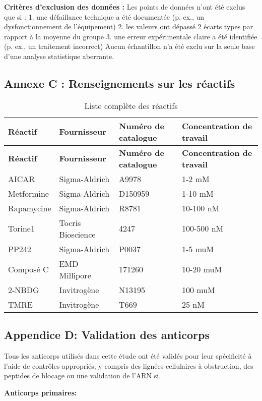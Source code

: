 \documentclass[11pt,a4paper]{article}
\begin{document}
\textbf{Critères d'exclusion des données :}
Les points de données n'ont été exclus que si : 1. une défaillance technique a été documentée (p. ex., un dysfonctionnement de l'équipement) 2. les valeurs ont dépassé 2 écarts types par rapport à la moyenne du groupe 3. une erreur expérimentale claire a été identifiée (p. ex., un traitement incorrect) Aucun échantillon n'a été exclu sur la seule base d'une analyse statistique aberrante.

\subsection*{Annexe C : Renseignements sur les réactifs}

\begin{longtable}{|p{3cm}|p{3cm}|p{3cm}|p{4cm}|}
\caption{Liste complète des réactifs} \\
\hline
\textbf{Réactif} & \textbf{Fournisseur} & \textbf{Numéro de catalogue} & \textbf{Concentration de travail} \\
\hline
\endfirsthead
\hline
\textbf{Réactif} & \textbf{Fournisseur} & \textbf{Numéro de catalogue} & \textbf{Concentration de travail} \\
\hline
\endhead
AICAR & Sigma-Aldrich & A9978 & 1-2 mM \\
Metformine & Sigma-Aldrich & D150959 & 1-10 mM \\
Rapamycine & Sigma-Aldrich & R8781 & 10-100 nM \\
Torine1 & Tocris Bioscience & 4247 & 100-500 nM \\
PP242 & Sigma-Aldrich & P0037 & 1-5 muM \\
Composé C & EMD Millipore & 171260 & 10-20 muM \\
2-NBDG & Invitrogène & N13195 & 100 muM \\
TMRE & Invitrogène & T669 & 25 nM \\
\hline
\end{longtable}

\subsection*{Appendice D: Validation des anticorps}

Tous les anticorps utilisés dans cette étude ont été validés pour leur spécificité à l'aide de contrôles appropriés, y compris des lignées cellulaires à obstruction, des peptides de blocage ou une validation de l'ARN si.

\textbf{Anticorps primaires:}
\end{document}
